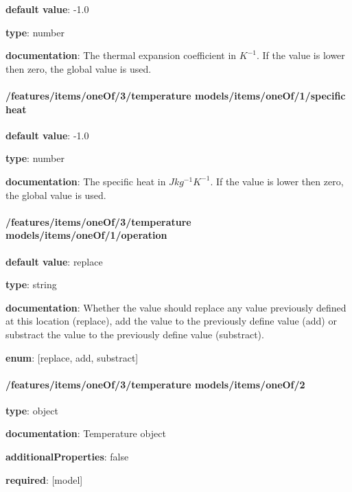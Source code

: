 \begin{itemized}
\item {\bf default value}: -1.0
\item {\bf type}: number
\item {\bf documentation}: The thermal expansion coefficient in $K^{-1}$. If the value is lower then zero, the global value is used.
\end{itemized}\paragraph{/features/items/oneOf/3/temperature models/items/oneOf/1/specific heat} \begin{itemized}
\item {\bf default value}: -1.0
\item {\bf type}: number
\item {\bf documentation}: The specific heat in $J kg^{-1} K^{-1}$. If the value is lower then zero, the global value is used.
\end{itemized}\paragraph{/features/items/oneOf/3/temperature models/items/oneOf/1/operation} \begin{itemized}
\item {\bf default value}: replace
\item {\bf type}: string
\item {\bf documentation}: Whether the value should replace any value previously defined at this location (replace), add the value to the previously define value (add) or substract the value to the previously define value (substract).
\item {\bf enum}: [replace, add, substract]\end{itemized}\paragraph{/features/items/oneOf/3/temperature models/items/oneOf/2} \begin{itemized}
\item {\bf type}: object
\item {\bf documentation}: Temperature object
\item {\bf additionalProperties}: false
\item {\bf required}: [model]\end{itemized}
